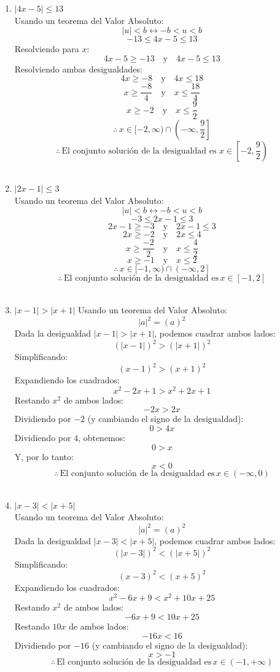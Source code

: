 \documentclass{article}
\begin{document}
\begin{enumerate}
  \item \(|4x-5|\leq 13\)\\
Usando un teorema del Valor Absoluto: 
\[
|u| < b \leftrightarrow -b < u < b
\]
\[
-13 \leq 4x-5 \leq 13
\]
Resolviendo para $x$:
\[
4x-5 \geq -13 \quad \text{y} \quad 4x-5 \leq 13
\]
Resolviendo ambas desigualdades:
\[
4x \geq -8 \quad \text{y} \quad 4x \leq 18
\]
\[
x \geq \frac{-8}{4} \quad \text{y} \quad x \leq \frac{18}{4}
\]
\[
x \geq -2 \quad \text{y} \quad x \leq \frac{9}{2}
\]
\[
\therefore \, x \in [-2, \infty) \cap \left(-\infty, \frac{9}{2}\right]
\]
\[
\therefore \, \text{El conjunto solución de la desigualdad es } x \in \left[-2, \frac{9}{2}\right)
\]\\

  \item \(|2x-1|\leq 3\)\\
Usando un teorema del Valor Absoluto: 
\[
|u| < b \leftrightarrow -b < u < b
\]
\[
-3 \leq 2x - 1 \leq 3
\]
\[
2x - 1 \geq -3 \quad \text{y} \quad 2x - 1 \leq 3
\]
\[
2x \geq -2 \quad \text{y} \quad 2x \leq 4
\]
\[
x \geq \frac{-2}{2} \quad \text{y} \quad x \leq \frac{4}{2}
\]
\[
x \geq -1 \quad \text{y} \quad x \leq 2
\]
\[
\therefore \, x \in [-1, \infty) \cap \left(-\infty, 2\right]
\]
\[
\therefore \, \text{El conjunto solución de la desigualdad es} \, x \in [-1, 2]
\]\\

  \item \(|x-1|>|x+1|\)
Usando un teorema del Valor Absoluto:
\[
|a|^2 = (a)^2
\]
Dada la desigualdad \( |x-1| > |x+1| \), podemos cuadrar ambos lados:
\[
(|x-1|)^2 > (|x+1|)^2
\]
Simplificando:
\[
(x-1)^2 > (x+1)^2
\]
Expandiendo los cuadrados:
\[
x^2 - 2x + 1 > x^2 + 2x + 1
\]
Restando \(x^2\) de ambos lados:
\[
-2x > 2x
\]
Dividiendo por \(-2\) (y cambiando el signo de la desigualdad):
\[
0 > 4x
\]
Dividiendo por \(4\), obtenemos:
\[
0 > x
\]
Y, por lo tanto:
\[
x < 0
\]
\[
\therefore \, \text{El conjunto solución de la desigualdad es} \, x \in (-\infty, 0)
\]\\

  \item \(|x-3|<|x+5|\)\\
Usando un teorema del Valor Absoluto:
\[
|a|^2 = (a)^2
\]
Dada la desigualdad \( |x-3| < |x+5| \), podemos cuadrar ambos lados:
\[
(|x-3|)^2 < (|x+5|)^2
\]
Simplificando:
\[
(x-3)^2 < (x+5)^2
\]
Expandiendo los cuadrados:
\[
x^2 - 6x + 9 < x^2 + 10x + 25
\]
Restando \(x^2\) de ambos lados:
\[
-6x + 9 < 10x + 25
\]
Restando \(10x\) de ambos lados:
\[
-16x < 16
\]
Dividiendo por \(-16\) (y cambiando el signo de la desigualdad):
\[
x > -1
\]
\[
\therefore \, \text{El conjunto solución de la desigualdad es} \, x \in (-1, +\infty)
\]\\


\end{enumerate}
\end{document}
